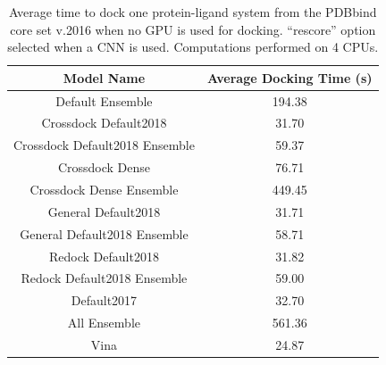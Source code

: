 \documentclass[journal=jcisd8,manuscript=article]{achemso}
\begin{document}
\begin{table}    
        \centering
        \begin{tabular}{|c|c|}
                \hline Model Name & Average Docking Time (s) \\ \hline
                Default Ensemble & 194.38\\ \hline
                Crossdock Default2018 & 31.70\\ \hline
                Crossdock Default2018 Ensemble & 59.37\\ \hline
                Crossdock Dense & 76.71\\ \hline
                Crossdock Dense Ensemble & 449.45\\ \hline
                General Default2018 & 31.71\\ \hline
                General Default2018 Ensemble & 58.71\\ \hline
                Redock Default2018 & 31.82\\ \hline
                Redock Default2018 Ensemble & 59.00\\ \hline
                Default2017 & 32.70\\ \hline
                All Ensemble & 561.36\\ \hline
                Vina & 24.87\\ \hline
        \end{tabular}    
        \caption{Average time to dock one protein-ligand system from the PDBbind core set v.2016 when no GPU is used for docking. ``rescore'' option selected when a CNN is used. Computations performed on 4 CPUs.}
        \label{tab:OptimalRescoreNoGPU}
\end{table}    
\end{document}
